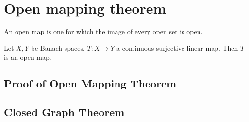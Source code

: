 \newpage
\section{Open mapping theorem}
\begin{definition}\label{open map}\nl
	An open map is one for which the image of every open set is open.
\end{definition}
\begin{theorem}\label{OMT}\nl
	Let $X,Y$ be Banach spaces, $T:X\xrightarrow{}Y$ a continuous surjective linear map. Then $T$ is an open map.
\end{theorem}

\begin{proposition}\label{Equinorm}
	\placeholder
\end{proposition}
\subsection{Proof of Open Mapping Theorem}
\placeholder
\subsection{Closed Graph Theorem}

\begin{definition}[Graph]\nl
	\placeholder
\end{definition}

\begin{theorem}\label{CGT}\nl
	\placeholder
\end{theorem}

\begin{definition}\label{Closed Operator}\nl
	\placeholder
\end{definition}
